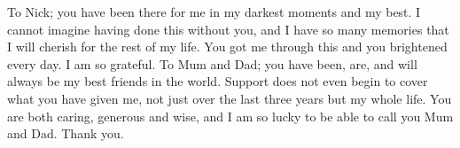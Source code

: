 %
To Nick; you have been there for me in my darkest moments and my best.  
I cannot imagine having done this without you, and I have so many memories that I will cherish for the rest of my life.  
You got me through this 
and you brightened every day. I am so grateful.
To Mum and Dad;  you have been, are, and will always be my best friends in the world.  Support does not even begin to cover what you have given me, not just over the last three years but my whole life.  You are both caring, generous and wise, and I am so lucky to be able to call you Mum and Dad.  Thank you.   




%
%

